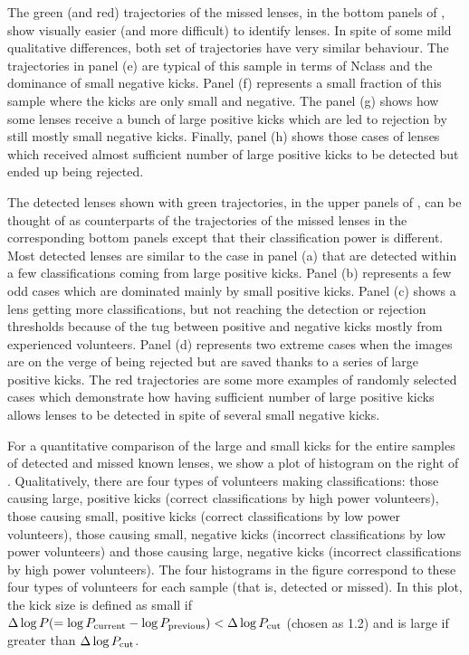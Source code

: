 \documentclass[useAMS,usenatbib,a4paper]{mn2e}
\begin{document}
The green (and red) trajectories of the missed lenses, in the bottom panels
of , show visually easier (and more difficult) to identify
lenses. In spite of some mild qualitative differences, both set of
trajectories have very similar behaviour. The trajectories in panel (e)
are typical of this sample in terms of Nclass and the dominance of small
negative kicks. Panel (f) represents a small fraction of this sample
where the kicks are only small and negative. The panel (g) shows how some
lenses receive a bunch of large positive kicks which are led to
rejection by still mostly small negative kicks. Finally, panel (h) shows
those cases of lenses which received almost sufficient number of large
positive kicks to be detected but ended up being rejected.

The detected lenses shown with green trajectories, in the upper
panels of , can be thought of as counterparts of the trajectories of the
missed lenses in the corresponding bottom panels except that their
classification power is different. Most detected lenses are similar to the case
in panel (a) that are detected within a few classifications coming from
large positive kicks.  Panel (b) represents a few odd cases which are
dominated mainly by small positive kicks. Panel (c) shows a lens getting
more classifications, but not reaching the detection or rejection
thresholds because of the tug between positive and negative kicks mostly
from experienced volunteers.  Panel (d) represents two extreme cases when
the images are on the verge of being rejected but are saved thanks to a
series of large positive kicks.  The red trajectories are some more
examples of randomly selected cases which demonstrate how having
sufficient number of large positive kicks allows lenses to be detected
in spite of several small negative kicks.

For a quantitative comparison of the large and small kicks for the
entire samples of detected and missed known lenses, we show a plot of
histogram on the right of . Qualitatively, there are
four types of volunteers making classifications: those causing large, positive
kicks (correct classifications by high power volunteers), those
causing small, positive kicks (correct classifications by low power
volunteers), those causing small, negative kicks (incorrect
classifications by low power volunteers) and those causing large, negative
kicks (incorrect classifications by high power volunteers). The
four histograms in the figure correspond to these four types of
volunteers for each sample (that is, detected or missed). In this plot,
the kick size
is defined as small if
$\Delta \log{P} (= \log{P_{\rm current}} - \log{P_{\rm
previous}}) < \Delta\log{P}_{\rm cut}$ (chosen as 1.2) and is large
if greater than $\Delta\log{P}_{\rm cut}$.
\end{document}

